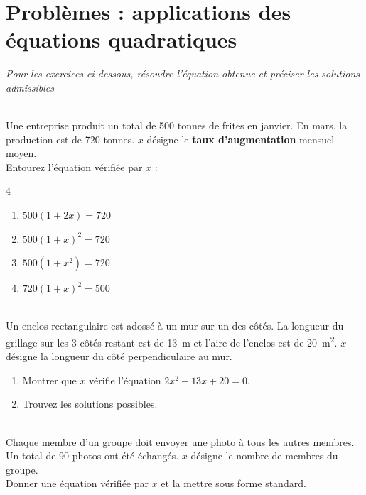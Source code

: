 \documentclass[main.tex]{subfiles}
\begin{document}
\section{Problèmes : applications des équations quadratiques}
\noindent\emph{Pour les exercices ci-dessous, résoudre l'équation obtenue et préciser les solutions   admissibles}
\begin{exercise}\label{chapter03:exercise:modelisation01} \hfill \\
	 Une entreprise produit un total de 500 tonnes de frites en janvier. En mars, la production est de 720 tonnes.  $x$ désigne le \textbf{taux d'augmentation} mensuel moyen.\\
Entourez l'équation vérifiée par $x$ :
	\vspace{-1em}
	\begin{multicols}{4}
		\begin{enumerate}[label={$(E_\arabic*)$}]
			\item $500(1+2x)=720$
			\item $500(1+x)^2=720$
			\item $500(1+x^2)=720$
			\item $720(1+x)^2=500$
		\end{enumerate}
	\end{multicols} 
\end{exercise} \vspace{-1em}
\begin{exercise}\label{chapter03:exercise:modelisation02}  \hfill \\
	 Un enclos rectangulaire est adossé à un mur sur un des côtés. La longueur du grillage sur les 3 côtés restant est de \SI{13}{\meter} et l'aire de l'enclos est de \SI{20}{\meter^2}.  
 $x$ désigne la longueur du côté perpendiculaire au mur. 
\begin{enumerate}[leftmargin=*,label=\alph*)] 
	\item Montrer que $x$ vérifie l'équation $2x^2-13x+20=0$. 
	\item Trouvez les solutions possibles.
\end{enumerate}
\end{exercise}
\begin{exercise}\label{chapter03:exercise:modelisation03}  \hfill \\
	 Chaque membre d'un groupe doit envoyer une photo à tous les autres membres. Un total de 90 photos ont été échangés.   
$x$ désigne le nombre de membres du groupe.\\
 Donner une équation vérifiée par $x$ et la mettre sous forme standard.
\end{exercise}
\end{document}
